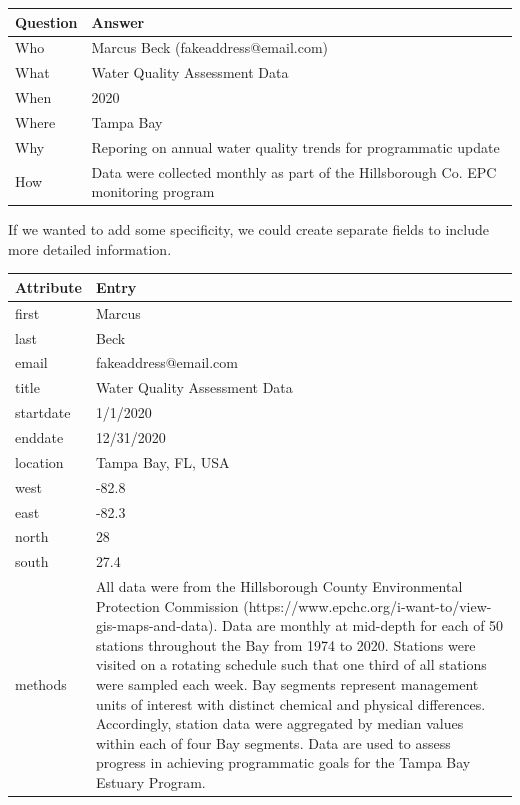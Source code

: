 \documentclass[
]{book}
\begin{document}
\begin{tabular}{l|l}
\hline
Question & Answer\\
\hline
Who & Marcus Beck (fakeaddress@email.com)\\
\hline
What & Water Quality Assessment Data\\
\hline
When & 2020\\
\hline
Where & Tampa Bay\\
\hline
Why & Reporing on annual water quality trends for programmatic update\\
\hline
How & Data were collected monthly as part of the Hillsborough Co. EPC monitoring program\\
\hline
\end{tabular}

If we wanted to add some specificity, we could create separate fields to include more detailed information.

\begin{tabular}{l|l}
\hline
Attribute & Entry\\
\hline
first & Marcus\\
\hline
last & Beck\\
\hline
email & fakeaddress@email.com\\
\hline
title & Water Quality Assessment Data\\
\hline
startdate & 1/1/2020\\
\hline
enddate & 12/31/2020\\
\hline
location & Tampa Bay, FL, USA\\
\hline
west & -82.8\\
\hline
east & -82.3\\
\hline
north & 28\\
\hline
south & 27.4\\
\hline
methods & All data were from the Hillsborough County Environmental Protection Commission (https://www.epchc.org/i-want-to/view-gis-maps-and-data). Data are monthly at mid-depth for each of 50 stations throughout the Bay from 1974 to 2020. Stations were visited on a rotating schedule such that one third of all stations were sampled each week. Bay segments represent management units of interest with distinct chemical and physical differences. Accordingly, station data were aggregated by median values within each of four Bay segments. Data are used to assess progress in achieving programmatic goals for the Tampa Bay Estuary Program.\\
\hline
\end{tabular}
\end{document}
